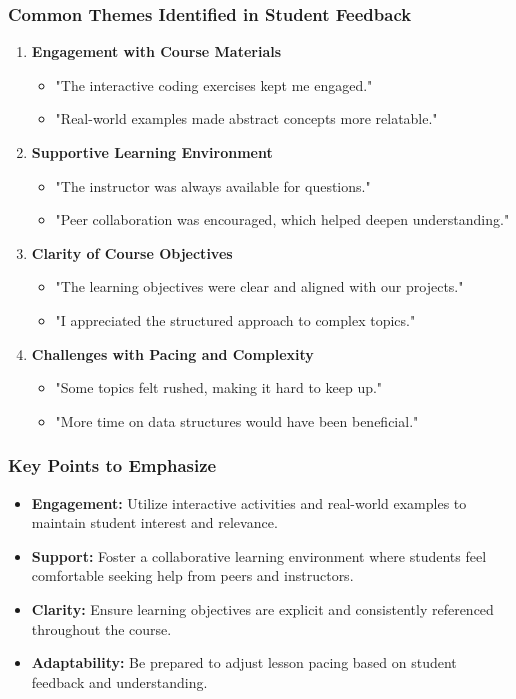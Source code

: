\documentclass{beamer}
\begin{document}
\begin{frame}[fragile]
    \frametitle{Common Themes Identified in Student Feedback}
    
    \begin{enumerate}
        \item \textbf{Engagement with Course Materials}
        \begin{itemize}
            \item "The interactive coding exercises kept me engaged."
            \item "Real-world examples made abstract concepts more relatable."
        \end{itemize}
        
        \item \textbf{Supportive Learning Environment}
        \begin{itemize}
            \item "The instructor was always available for questions."
            \item "Peer collaboration was encouraged, which helped deepen understanding."
        \end{itemize}
        
        \item \textbf{Clarity of Course Objectives}
        \begin{itemize}
            \item "The learning objectives were clear and aligned with our projects."
            \item "I appreciated the structured approach to complex topics."
        \end{itemize}
        
        \item \textbf{Challenges with Pacing and Complexity}
        \begin{itemize}
            \item "Some topics felt rushed, making it hard to keep up."
            \item "More time on data structures would have been beneficial."
        \end{itemize}
    \end{enumerate}
\end{frame}

\begin{frame}[fragile]
    \frametitle{Key Points to Emphasize}
    \begin{itemize}
        \item \textbf{Engagement:} Utilize interactive activities and real-world examples to maintain student interest and relevance.
        \item \textbf{Support:} Foster a collaborative learning environment where students feel comfortable seeking help from peers and instructors.
        \item \textbf{Clarity:} Ensure learning objectives are explicit and consistently referenced throughout the course.
        \item \textbf{Adaptability:} Be prepared to adjust lesson pacing based on student feedback and understanding.
    \end{itemize}
\end{frame}
\end{document}
